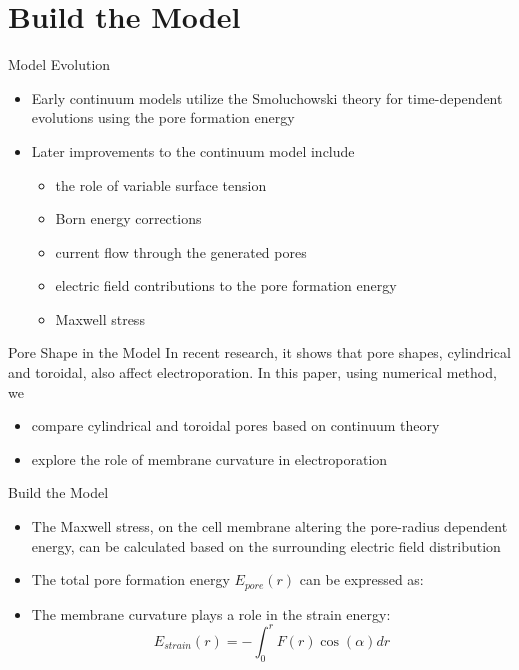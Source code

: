 \documentclass[UTF8]{ctexbeamer}
\begin{document}
\section{Build the Model}
\frame{\tableofcontents[currentsection]}
\begin{frame}{Model Evolution}
\begin{itemize}
	\item Early continuum models utilize the Smoluchowski theory for time-dependent evolutions using the pore formation energy
	\item Later improvements to the continuum model include
	\begin{itemize}
		\item the role of variable surface tension
		\item Born energy corrections
		\item current flow through the generated pores
		\item electric field contributions to the pore formation energy
		\item Maxwell stress
	\end{itemize}
\end{itemize}

\end{frame}

\begin{frame}{Pore Shape in the Model}
In recent research, it shows that pore shapes, cylindrical and toroidal, also affect electroporation.
In this paper, using numerical method, we
\begin{itemize}
	\item compare cylindrical and toroidal pores based on continuum theory
	\item explore the role of membrane curvature in electroporation
\end{itemize} 
\end{frame}

\begin{frame}{Build the Model}
\begin{itemize}
	\item The Maxwell stress, on the cell membrane altering the pore-radius dependent energy, can be calculated based 	on the surrounding electric field distribution
	\item The total pore formation energy $ E_{pore}(r) $ can be expressed as: 
	

	\item  The membrane curvature plays a role in the strain energy:
	\[ 
	E_{strain}(r) = -\int_{0}^{r} F(r)\cos(\alpha)dr
	\]
\end{itemize}
\end{frame}
\end{document}
